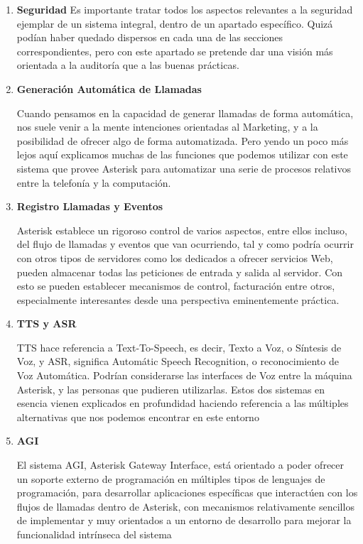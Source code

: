 \begin{enumerate}
	  \setlength{\itemsep}{10pt}

	\item \textbf{Seguridad}
	Es importante tratar todos los aspectos relevantes a la seguridad ejemplar de un sistema integral, dentro de un apartado específico. Quizá podían haber quedado dispersos en cada una de las secciones correspondientes, pero con este apartado se pretende dar una visión más orientada a la auditoría que a las buenas prácticas.
	
	\item \textbf{Generación Automática de Llamadas}
	
	Cuando pensamos en la capacidad de generar llamadas de forma automática, nos suele venir a la mente intenciones orientadas al Marketing, y a la posibilidad de ofrecer algo de forma automatizada. Pero yendo un poco más lejos aquí explicamos muchas de las funciones que podemos utilizar con este sistema que provee Asterisk para automatizar una serie de procesos relativos entre la telefonía y la computación.
	
	\item \textbf{Registro Llamadas y Eventos}
	
	Asterisk establece un rigoroso control de varios aspectos, entre ellos incluso, del flujo de llamadas y eventos que van ocurriendo, tal y como podría ocurrir con otros tipos de servidores como los dedicados a ofrecer servicios Web, pueden almacenar todas las peticiones de entrada y salida al servidor. Con esto se pueden establecer mecanismos de control, facturación entre otros, especialmente interesantes desde una perspectiva eminentemente práctica.
	
	\item \textbf{TTS y ASR}
	
	TTS hace referencia a Text-To-Speech, es decir, Texto a Voz, o Síntesis de Voz, y ASR, significa Automátic Speech Recognition, o reconocimiento de Voz Automática. Podrían considerarse las interfaces de Voz entre la máquina Asterisk, y las personas que pudieren utilizarlas. Estos dos sistemas en esencia vienen explicados en profundidad haciendo referencia a las múltiples alternativas que nos podemos encontrar en este entorno
	
  \item \textbf{AGI}
	
	El sistema AGI, Asterisk Gateway Interface, está orientado a poder ofrecer un soporte externo de programación en múltiples tipos de lenguajes de programación, para desarrollar aplicaciones específicas que interactúen con los flujos de llamadas dentro de Asterisk, con mecanismos relativamente sencillos de implementar y muy orientados a un entorno de desarrollo para mejorar la funcionalidad intrínseca del sistema
	

\end{enumerate}
